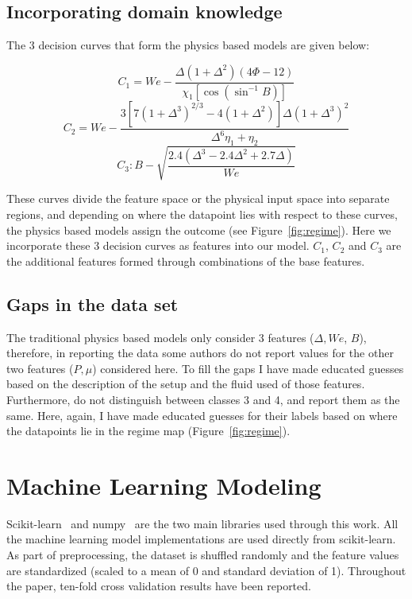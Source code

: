 \documentclass{article}
\begin{document}
\subsection{Incorporating domain knowledge}
The 3 decision curves that form the physics based models \cite{munnannur2007new} are given below:

\begin{equation}
\label{eq:c1}
 C_1 = We - \frac{\Delta(1+\Delta^2)(4\Phi - 12)}{\chi_1\left[ \cos\left( \sin^{-1}B\right) \right]}
\end{equation}
\begin{equation}
\label{eq:c2}
 C_2 = We - \frac{3[7(1+\Delta^3)^{2/3} - 4(1+\Delta^2)]\Delta(1+\Delta^3)^2}{\Delta^6 \eta_1 + \eta_2}
\end{equation}
\begin{equation}
\label{eq:c3}
C_3: B - \sqrt{\frac{2.4(\Delta^3- 2.4 \Delta^2 + 2.7\Delta)}{We}}
\end{equation}

These curves divide the feature space or the physical input space into separate regions, and depending on where the datapoint lies with respect to these curves, the physics based models assign the outcome (see Figure~\ref{fig:regime}). Here we incorporate these 3 decision curves as features into our model. $C_1$, $C_2$ and $C_3$ are the additional features formed through combinations of the base features. 

\subsection{Gaps in the data set}
The traditional physics based models only consider 3 features ($\Delta, We$, $B$), therefore, in reporting the data some authors do not report values for the other two features ($P, \mu$) considered here. To fill the gaps I have made educated guesses based on the description of the setup and the fluid used of those features. Furthermore, \citet{qian1997regimes} do not distinguish between classes 3 and 4, and report them as the same. Here, again, I have made educated guesses for their labels based on where the datapoints lie in the regime map (Figure~\ref{fig:regime}).

\section{Machine Learning Modeling}
Scikit-learn~\cite{scikit_learn} and numpy~\cite{harris2020array} are the two main libraries used through this work. All the machine learning model implementations are used directly from scikit-learn. As part of preprocessing, the dataset is shuffled randomly and the feature values are standardized (scaled  to a mean of 0 and standard deviation of 1). Throughout the paper, ten-fold cross validation results have been reported.
\end{document}
